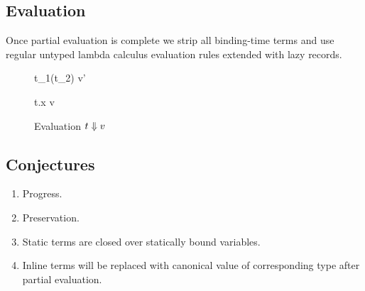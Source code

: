 \subsection{Evaluation}
Once partial evaluation is complete we strip all binding-time terms and use regular untyped
lambda calculus evaluation rules extended with lazy records.

\begin{figure}

  {t_1(t_2) \e v'}

  {t.x \e v}
\caption{Evaluation $t \Downarrow v$}
\end{figure}

\subsection{Conjectures}

\begin{enumerate}
  \item Progress.
  \item Preservation.
  \item Static terms are closed over statically bound variables.
  \item Inline terms will be replaced with canonical value of corresponding type after partial evaluation.
\end{enumerate}

\clearpage
